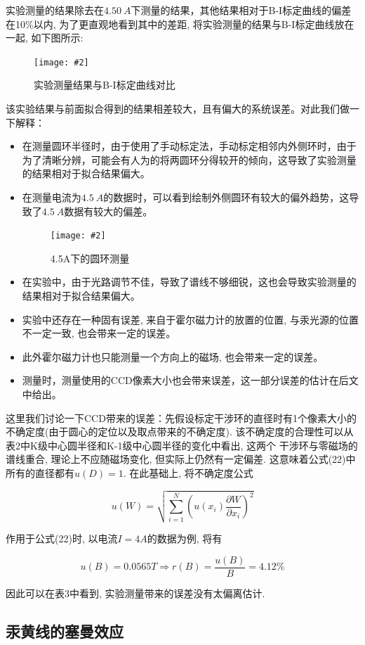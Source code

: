 \documentclass[12pt,a4paper]{article}
\newcommand{\be}[1]{
    \begin{equation}
        #1
    \end{equation}
}
\newcommand{\bfig}[3]{
    \begin{figure}[H]
        \centering
        \texttt{[image: \#2]}
        \caption{#3}
    \end{figure}
}
\begin{document}
    实验测量的结果除去在$\SI{4.50}{A}$下测量的结果，其他结果相对于B-I标定曲线的偏差在10\%以内, 为了更直观地看到其中的差距, 将实验测量的结果与B-I标定曲线放在一起, 如下图所示: 
    \bfig{0.6}{B_measure.png}{实验测量结果与B-I标定曲线对比}
该实验结果与前面拟合得到的结果相差较大，且有偏大的系统误差。对此我们做一下解释：
\begin{itemize}
  \item 在测量圆环半径时，由于使用了手动标定法，手动标定相邻内外侧环时，由于为了清晰分辨，可能会有人为的将两圆环分得较开的倾向，这导致了实验测量的结果相对于拟合结果偏大。
  \item 在测量电流为$\SI{4.5}{A}$的数据时，可以看到绘制外侧圆环有较大的偏外趋势，这导致了$\SI{4.5}{A}$数据有较大的偏差。
  \bfig{0.3}{MultiRings@4.50A_measure.jpg}{4.5A下的圆环测量}
  \item 在实验中，由于光路调节不佳，导致了谱线不够细锐，这也会导致实验测量的结果相对于拟合结果偏大。
  \item 实验中还存在一种固有误差, 来自于霍尔磁力计的放置的位置, 与汞光源的位置不一定一致, 也会带来一定的误差。
  \item 此外霍尔磁力计也只能测量一个方向上的磁场, 也会带来一定的误差。
  \item 测量时，测量使用的CCD像素大小也会带来误差，这一部分误差的估计在后文中给出。
\end{itemize}
这里我们讨论一下CCD带来的误差：先假设标定干涉环的直径时有1个像素大小的不确定度(由于圆心的定位以及取点带来的不确定度). 该不确定度的合理性可以从表2中K级中心圆半径和K-1级中心圆半径的变化中看出, 这两个
干涉环与零磁场的谱线重合, 理论上不应随磁场变化, 但实际上仍然有一定偏差. 这意味着公式(22)中所有的直径都有$u(D)=1$. 在此基础上, 将不确定度公式
\be{ u(W)=\sqrt{\sum_{i=1}^{N}\left(u\left(x_{i}\right) \frac{\partial W}{\partial x_{i}}\right)^{2}}}
作用于公式(22)时, 以电流$I=4A$的数据为例, 将有
\be{u(B)=0.0565T \Rightarrow r(B)=\frac{u(B)}{B}=4.12\%}
因此可以在表3中看到, 实验测量带来的误差没有太偏离估计.  

\subsection{汞黄线的塞曼效应}
\end{document}
